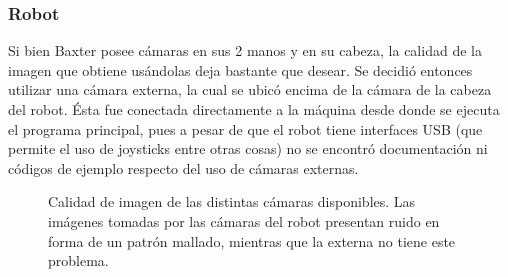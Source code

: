\subsubsection{Robot}
Si bien Baxter posee cámaras en sus 2 manos y en su cabeza, la calidad de la imagen que obtiene usándolas deja bastante que desear. Se decidió entonces utilizar una cámara externa, la cual se ubicó encima de la cámara de la cabeza del robot. Ésta fue conectada directamente a la máquina desde donde se ejecuta el programa principal, pues a pesar de que el robot tiene interfaces USB (que permite el uso de joysticks entre otras cosas) no se encontró documentación ni códigos de ejemplo respecto del uso de cámaras externas.
\begin{figure}[h!]
	\centering
	\hfill
	\hfill
	\hfill
	\caption{Calidad de imagen de las distintas cámaras disponibles. Las imágenes tomadas por las cámaras del robot presentan ruido en forma de un patrón mallado, mientras que la externa no tiene este problema.}
	\label{camaras}
\end{figure}

